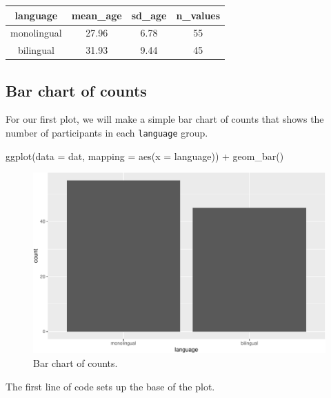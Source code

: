 \documentclass[
  english,
  doc,floatsintext]{apa6}
\newenvironment{Shaded}{\begin{snugshade}}{\end{snugshade}}
\newcommand{\AttributeTok}[1]{\textcolor[rgb]{0.77,0.63,0.00}{#1}}
\newcommand{\FunctionTok}[1]{\textcolor[rgb]{0.00,0.00,0.00}{#1}}
\newcommand{\NormalTok}[1]{#1}
\newcommand{\SpecialCharTok}[1]{\textcolor[rgb]{0.00,0.00,0.00}{#1}}
\begin{document}
\begin{tabular}{c|c|c|c}
\hline
language & mean\_age & sd\_age & n\_values\\
\hline
monolingual & 27.96 & 6.78 & 55\\
\hline
bilingual & 31.93 & 9.44 & 45\\
\hline
\end{tabular}

\hypertarget{bar-chart-of-counts}{%
\subsection{Bar chart of counts}\label{bar-chart-of-counts}}

For our first plot, we will make a simple bar chart of counts that shows the number of participants in each \texttt{language} group.

\begin{Shaded}
\begin{Highlighting}[]
\FunctionTok{ggplot}\NormalTok{(}\AttributeTok{data =}\NormalTok{ dat, }\AttributeTok{mapping =} \FunctionTok{aes}\NormalTok{(}\AttributeTok{x =}\NormalTok{ language)) }\SpecialCharTok{+}
  \FunctionTok{geom\_bar}\NormalTok{()}
\end{Highlighting}
\end{Shaded}

\begin{figure}

{\centering \includegraphics[width=1\linewidth]{images/bar1-1} 

}

\caption{Bar chart of counts.}\label{fig:bar1}
\end{figure}

The first line of code sets up the base of the plot.
\end{document}
